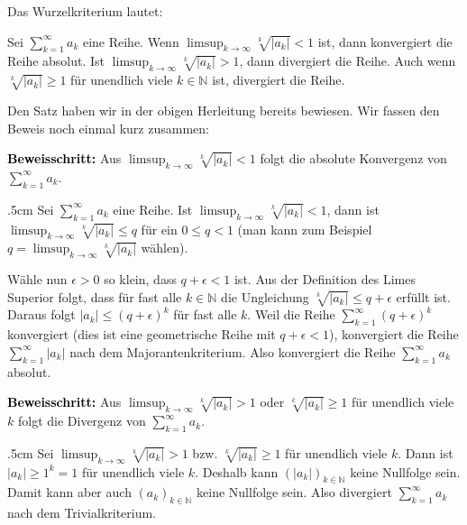 \documentclass[fontsize=9pt,
               parskip=half-,
               DIV=14,
               listof=chapterentry,
               tocflat]{scrbook}
\newenvironment{indentblock}{\begin{adjustwidth}{.5cm}{}}{\end{adjustwidth}}
\newcommand{\proofstep}[1]{\textbf{\textcolor{Black}{#1}}}
\begin{document}
Das Wurzelkriterium lautet:

\begin{theorem*}[Wurzelkriterium]
Sei $\sum _{k=1}^{\infty }a_{k}$ eine Reihe. Wenn $\limsup _{k\to \infty }{\sqrt[{k}]{|a_{k}|}}<1$ ist, dann konvergiert die Reihe absolut. Ist $\limsup _{k\to \infty }{\sqrt[{k}]{|a_{k}|}}>1$, dann divergiert die Reihe. Auch wenn ${\sqrt[{k}]{|a_{k}|}}\geq 1$ für unendlich viele $k\in \mathbb {N} $ ist, divergiert die Reihe.

\end{theorem*}

\begin{explanation*}[Wurzelkriterium]
Den Satz haben wir in der obigen Herleitung bereits bewiesen. Wir fassen den Beweis noch einmal kurz zusammen:

\end{explanation*}

\begin{proof*}[Wurzelkriterium]
\proofstep{Beweisschritt:}
 Aus $\limsup _{k\to \infty }{\sqrt[{k}]{|a_{k}|}}<1$ folgt die absolute Konvergenz von $\sum _{k=1}^{\infty }a_{k}$.\begin{indentblock}
Sei $\sum _{k=1}^{\infty }a_{k}$ eine Reihe. Ist $\limsup _{k\to \infty }{\sqrt[{k}]{|a_{k}|}}<1$, dann ist $\limsup _{k\to \infty }{\sqrt[{k}]{|a_{k}|}}\leq q$ für ein $0\leq q<1$ (man kann zum Beispiel $q=\limsup _{k\to \infty }{\sqrt[{k}]{|a_{k}|}}$ wählen).

Wähle nun $\epsilon >0$ so klein, dass $q+\epsilon <1$ ist. Aus der Definition des Limes Superior folgt, dass für fast alle $k\in \mathbb {N} $ die Ungleichung ${\sqrt[{k}]{|a_{k}|}}\leq q+\epsilon $ erfüllt ist. Daraus folgt $|a_{k}|\leq (q+\epsilon )^{k}$ für fast alle $k$. Weil die Reihe $\sum _{k=1}^{\infty }(q+\epsilon )^{k}$ konvergiert (dies ist eine geometrische Reihe mit $q+\epsilon <1$), konvergiert die Reihe $\sum _{k=1}^{\infty }|a_{k}|$ nach dem Majorantenkriterium. Also konvergiert die Reihe $\sum _{k=1}^{\infty }a_{k}$ absolut.

\end{indentblock}

\proofstep{Beweisschritt:}
 Aus $\limsup _{k\to \infty }{\sqrt[{k}]{|a_{k}|}}>1$ oder ${\sqrt[{k}]{|a_{k}|}}\geq 1$ für unendlich viele $k$ folgt die Divergenz von $\sum _{k=1}^{\infty }a_{k}$.\begin{indentblock}
Sei $\limsup _{k\to \infty }{\sqrt[{k}]{|a_{k}|}}>1$ bzw. ${\sqrt[{k}]{|a_{k}|}}\geq 1$ für unendlich viele $k$. Dann ist $|a_{k}|\geq 1^{k}=1$ für unendlich viele $k$. Deshalb kann $\left(|a_{k}|\right)_{k\in \mathbb {N} }$ keine Nullfolge sein. Damit kann aber auch $\left(a_{k}\right)_{k\in \mathbb {N} }$ keine Nullfolge sein. Also divergiert $\sum _{k=1}^{\infty }a_{k}$ nach dem Trivialkriterium.

\end{indentblock}

\end{proof*}
\end{document}
